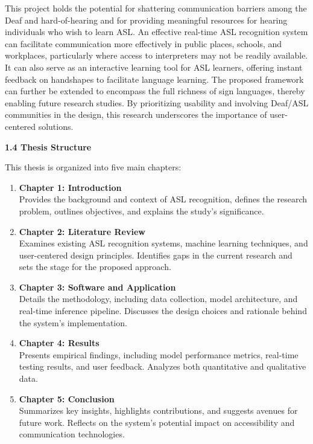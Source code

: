 \documentclass[12pt]{article}
\begin{document}
This project holds the potential for shattering communication barriers among the Deaf and 
hard-of-hearing and for providing meaningful resources for hearing individuals who wish to learn 
ASL. An effective real-time ASL recognition system can facilitate communication more effectively 
in public places, schools, and workplaces, particularly where access to interpreters may not be 
readily available. It can also serve as an interactive learning tool for ASL learners, offering 
instant feedback on handshapes to facilitate language learning. The proposed framework can further 
be extended to encompass the full richness of sign languages, thereby enabling future research 
studies. By prioritizing usability and involving Deaf/ASL communities in the design, this research 
underscores the importance of user-centered solutions.

\vspace{1.5em}
\noindent
\textbf{1.4 Thesis Structure}
\noindent
This thesis is organized into five main chapters:

\begin{enumerate}
  \item \textbf{Chapter 1: Introduction}\\
  Provides the background and context of ASL recognition, defines the research problem, outlines objectives, and explains the study’s significance.
  \item \textbf{Chapter 2: Literature Review}\\
  Examines existing ASL recognition systems, machine learning techniques, and user-centered design principles. Identifies gaps in the current research and sets the stage for the proposed approach.
  \item \textbf{Chapter 3: Software and Application}\\
  Details the methodology, including data collection, model architecture, and real-time inference pipeline. Discusses the design choices and rationale behind the system’s implementation.
  \item \textbf{Chapter 4: Results}\\
  Presents empirical findings, including model performance metrics, real-time testing results, and user feedback. Analyzes both quantitative and qualitative data.
  \item \textbf{Chapter 5: Conclusion}\\
  Summarizes key insights, highlights contributions, and suggests avenues for future work. Reflects on the system’s potential impact on accessibility and communication technologies.
\end{enumerate}
\end{document}
